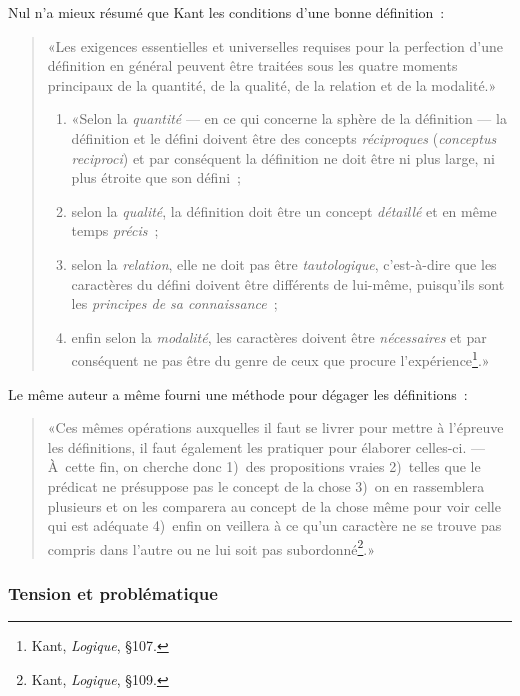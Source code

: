 \documentclass[a4paper,11pt]{article}
\newcommand{\cad}{c'est-à-dire}
\begin{document}
Nul n'a mieux résumé que Kant les conditions d'une bonne définition~:
\begin{quote}
  «Les exigences essentielles et universelles requises pour la
  perfection d'une définition en général peuvent être traitées sous les
  quatre moments principaux de la quantité, de la qualité, de la
  relation et de la modalité.»

  \begin{enumerate}
  \item «Selon la \emph{quantité} --- en ce qui concerne la sphère de la
    définition --- la définition et le défini doivent être des concepts
    \emph{réciproques} (\emph{conceptus reciproci}) et par conséquent la
    définition ne doit être ni plus large, ni plus étroite que son défini~;
  \item selon la \emph{qualité}, la définition doit être un concept
    \emph{détaillé} et en même temps \emph{précis}~;
  \item selon la \emph{relation}, elle ne doit pas être
    \emph{tautologique}, \cad{} que les caractères du défini doivent
    être différents de lui-même, puisqu'ils sont les \emph{principes de
      sa connaissance}~;
  \item enfin selon la \emph{modalité}, les caractères doivent être
    \emph{nécessaires} et par conséquent ne pas être du genre de ceux
    que procure l'expérience\footnote{Kant, \emph{Logique}, §107.}.»
  \end{enumerate}
\end{quote}
Le même auteur a même fourni une méthode pour dégager les définitions~: 
\begin{quote}
  «Ces mêmes opérations auxquelles il faut se livrer pour mettre à
  l'épreuve les définitions, il faut également les pratiquer pour
  élaborer celles-ci. --- À~cette fin, on cherche donc 1)~des
  propositions vraies 2)~telles que le prédicat ne présuppose pas le
  concept de la chose 3)~on en rassemblera plusieurs et on les comparera
  au concept de la chose même pour voir celle qui est adéquate 4)~enfin
  on veillera à ce qu'un caractère ne se trouve pas compris dans l'autre
  ou ne lui soit pas subordonné\footnote{Kant, \emph{Logique}, §109.}.»
\end{quote}



\subsubsection{Tension et problématique}
\end{document}
